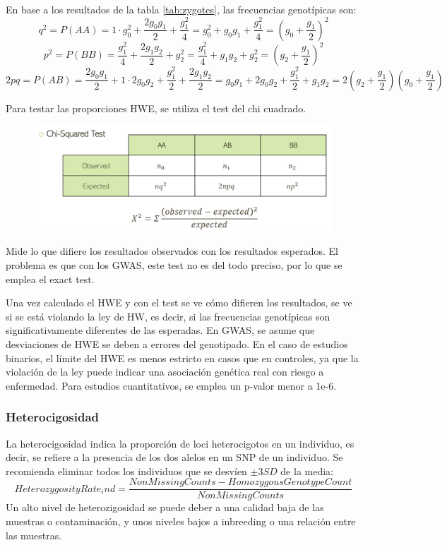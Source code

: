 En base a los resultados de la tabla \ref{tab:zygotes}, las frecuencias genotípicas son:
$$q^2 = P(AA) = 1 \cdot g_0^2 + \frac{2g_0g_1}{2} + \frac{g_1^2}{4} = g_0^2 + g_0g_1 + \frac{g_1^2}{4} = (g_0 + \frac{g_1}{2})^2$$
$$p^2 = P(BB) = \frac{g_1^2}{4} + \frac{2g_1g_2}{2} + g_2^2 = \frac{g_1^2}{4} + g_1g_2 + g_2^2 = (g_2 + \frac{g_1}{2})^2$$
$$2pq = P(AB) = \frac{2g_0g_1}{2} + 1 \cdot 2g_0g_2 + \frac{g_1^2}{2} + \frac{2g_1g_2}{2} = g_0g_1 + 2g_0g_2 + \frac{g_1^2}{2} + g_1g_2 = 2(g_2 + \frac{g_1}{2})(g_0 + \frac{g_1}{2})$$

Para testar las proporciones HWE, se utiliza el test del chi cuadrado.

\begin{figure}[htbp]
\centering
\includegraphics[width = \textwidth]{figs/chi-cuadrado.png}
\end{figure}

Mide lo que difiere los resultados observados con los resultados esperados. El problema es que con los GWAS, este test no es del todo preciso, por lo que se emplea el exact test.

Una vez calculado el HWE y con el test se ve cómo difieren los resultados, se ve si se está violando la ley de HW, es decir, si las frecuencias genotípicas son significativamente diferentes de las esperadas. En GWAS, se asume que desviaciones de HWE se deben a errores del genotipado. En el caso de estudios binarios, el límite del HWE es menos estricto en casos que en controles, ya que la violación de la ley puede indicar una asociación genética real con riesgo a enfermedad. Para estudios cuantitativos, se emplea un p-valor menor a 1e-6. 

\subsubsection{Heterocigosidad}
La heterocigosidad indica la proporción de loci heterocigotos en un individuo, es decir, se refiere a la presencia de los dos alelos en un SNP de un individuo. Se recomienda eliminar todos los individuos que se desvíen $\pm 3 SD$ de la media:
$$HeterozygosityRate_ind = \frac{NonMissingCounts - HomozygousGenotypeCount}{NonMissingCounts}$$
Un alto nivel de heterozigosidad se puede deber a una calidad baja de las muestras o contaminación, y unos niveles bajos a inbreeding o una relación entre las muestras.

